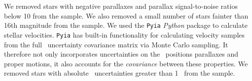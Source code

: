 We removed stars with negative parallaxes and parallax signal-to-noise ratios
below 10 from the sample.
We also removed a small number of stars fainter than 16th magnitude from the
sample.
We used the {\tt Pyia} {\it Python} package to calculate stellar velocities.
{\tt Pyia} has built-in functionality for calculating velocity samples from
the full \gaia\ uncertainty covariance matrix via Monte Carlo sampling.
It therefore not only incorporates uncertainties on the \gaia\ positions
parallaxes and proper motions, it also accounts for the {\it covariance}
between these properties.
We removed stars with absolute \vb\ uncertainties greater than 1 \kms\ from
the sample.

